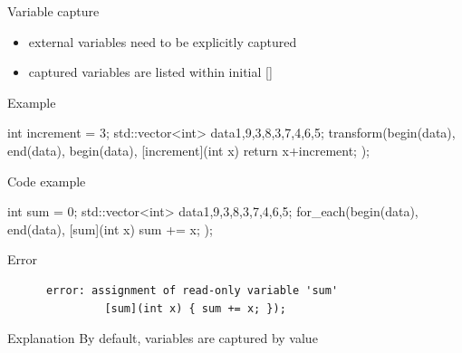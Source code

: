 \begin{frame}[fragile]
  \begin{block}{Variable capture}
    \begin{itemize}
    \item external variables need to be explicitly captured
    \item captured variables are listed within initial []
    \end{itemize}
  \end{block}
  \pause
  \begin{exampleblock}{Example}
    \begin{cppcode*}{}
      int increment = 3;
      std::vector<int> data{1,9,3,8,3,7,4,6,5};
      transform(begin(data), end(data), begin(data),
                [increment](int x) {
                  return x+increment;
                });
    \end{cppcode*}
  \end{exampleblock}
\end{frame}

\begin{frame}[fragile]
  \begin{exampleblock}{Code example}
    \begin{cppcode}
      int sum = 0;
      std::vector<int> data{1,9,3,8,3,7,4,6,5};
      for_each(begin(data), end(data),
              [sum](int x) { sum += x; });
    \end{cppcode}
  \end{exampleblock}
  \pause
  \begin{alertblock}{Error}
    \begin{verbatim}
      error: assignment of read-only variable 'sum'
               [sum](int x) { sum += x; });
    \end{verbatim}
  \end{alertblock}
  \pause
  \begin{block}{Explanation}
    By default, variables are captured by value
  \end{block}
\end{frame}

